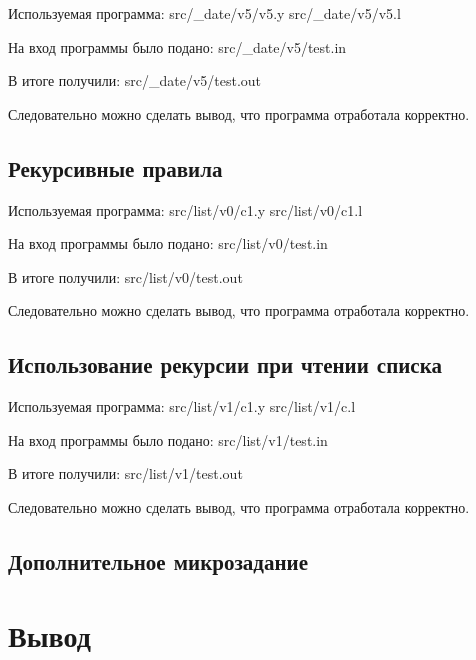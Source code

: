     Используемая программа:
     {src/_date/v5/v5.y}
     {src/_date/v5/v5.l}

    На вход программы было подано:
     {src/_date/v5/test.in}

    В итоге получили:
     {src/_date/v5/test.out}

    Следовательно можно сделать вывод, что программа отработала корректно.


\subsection{Рекурсивные правила}

    Используемая программа:
     {src/list/v0/c1.y}
     {src/list/v0/c1.l}

    На вход программы было подано:
     {src/list/v0/test.in}

    В итоге получили:
     {src/list/v0/test.out}

    Следовательно можно сделать вывод, что программа отработала корректно.


\subsection{Использование рекурсии при чтении списка}

    Используемая программа:
     {src/list/v1/c1.y}
     {src/list/v1/c.l}

    На вход программы было подано:
     {src/list/v1/test.in}

    В итоге получили:
     {src/list/v1/test.out}

    Следовательно можно сделать вывод, что программа отработала корректно.


\subsection{Дополнительное микрозадание}


\section{Вывод}



